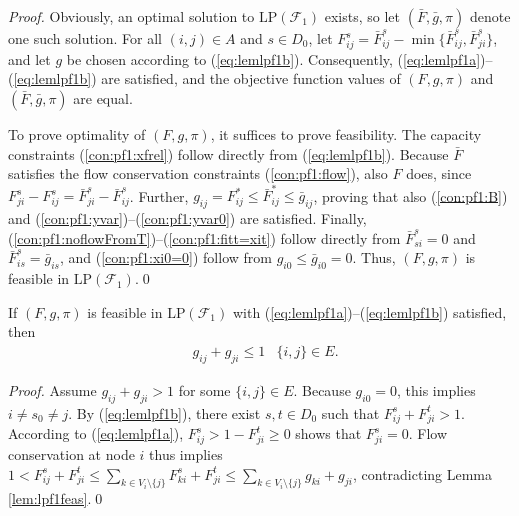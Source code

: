 \begin{proof}
Obviously, an optimal solution to $\text{LP}(\mathcal{F}_1)$ exists, so let $(\bar{F},\bar{g},\pi)$ denote one such solution.
For all $(i,j)\in A$ and $s\in D_0$, let $F_{ij}^s=\bar{F}_{ij}^s-\min\{\bar{F}_{ij}^s, \bar{F}_{ji}^s\}$, and let $g$ be chosen according to (\ref{eq:lemlpf1b}).
Consequently, (\ref{eq:lemlpf1a})--(\ref{eq:lemlpf1b}) are satisfied, and the objective function values of $(F,g,\pi)$ and $(\bar{F},\bar{g},\pi)$ are equal.

To prove optimality of $(F,g,\pi)$, it suffices to prove feasibility.
The capacity constraints (\ref{con:pf1:xfrel}) follow directly from (\ref{eq:lemlpf1b}).
Because $\bar{F}$ satisfies the flow conservation constraints (\ref{con:pf1:flow}), also $F$ does, since
$F_{ji}^s-F_{ij}^s=\bar{F}_{ji}^s-\bar{F}_{ij}^s$.
Further, $g_{ij}=F_{ij}^*\leq\bar{F}_{ij}^*\leq\bar{g}_{ij}$, proving that also (\ref{con:pf1:B}) and (\ref{con:pf1:yvar})--(\ref{con:pf1:yvar0}) are satisfied.
Finally, (\ref{con:pf1:noflowFromT})--(\ref{con:pf1:fitt=xit}) follow directly from $\bar{F}_{si}^s=0$ and $\bar{F}_{is}^s=\bar{g}_{is}$,
and (\ref{con:pf1:xi0=0}) follow from $g_{i0}\leq \bar{g}_{i0}=0$.
Thus, $(F,g,\pi)$ is feasible in $\text{LP}(\mathcal{F}_1)$.\qed
\end{proof}

\begin{lemma} \label{lem:lpf1gijgji}
If $(F,g,\pi)$ is feasible in $\text{LP}(\mathcal{F}_1)$ with (\ref{eq:lemlpf1a})--(\ref{eq:lemlpf1b}) satisfied, then
\begin{equation}
\begin{aligned}
 & g_{ij}+g_{ji} \leq 1 & \{i,j\}\in E. \label{eq:lemlpf1c}
\end{aligned}
\end{equation}
\end{lemma}
\begin{proof}
Assume $g_{ij}+g_{ji}>1$ for some $\{i,j\}\in E$.
Because $g_{i0}=0$, this implies $i\neq s_0\neq j$.
By (\ref{eq:lemlpf1b}), there exist $s,t\in D_0$ such that $F_{ij}^s+F_{ji}^t>1$.
According to (\ref{eq:lemlpf1a}), $F_{ij}^s>1-F_{ji}^t\geq 0$ shows that $F_{ji}^s=0$.
Flow conservation at node $i$ thus implies $1<F_{ij}^s+F_{ji}^t\leq\sum_{k\in V_i\setminus\{j\}}F_{ki}^s+F_{ji}^t
\leq\sum_{k\in V_i\setminus\{j\}}g_{ki}+g_{ji}$, contradicting Lemma \ref{lem:lpf1feas}.\qed
\end{proof}

